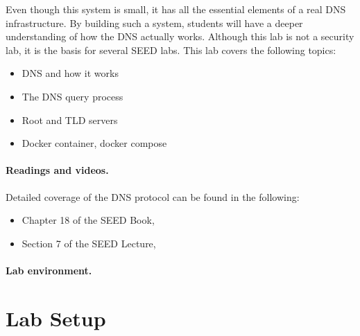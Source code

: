 Even though this system is small, it has all the essential
elements of a real DNS infrastructure. By building such a system,
students will have a deeper understanding of how the DNS actually works. 
Although this lab is not a security lab, it is the basis for
several SEED labs. This lab covers the following topics:

\begin{itemize}[noitemsep]
\item DNS and how it works
\item The DNS query process
\item Root and TLD servers
\item Docker container, docker compose
\end{itemize}



\paragraph{Readings and videos.}
Detailed coverage of the DNS protocol can be found in the following:

\begin{itemize}
\item Chapter 18 of the SEED Book, \seedbook
\item Section 7 of the SEED Lecture, \seedisvideo
\end{itemize}


\paragraph{Lab environment.} 
\seedenvironmentB
\nodependency





\section{Lab Setup} 


